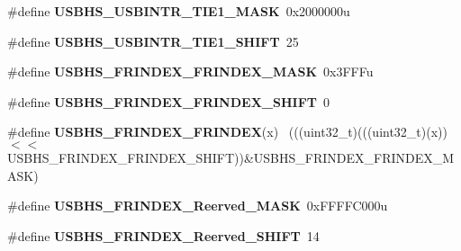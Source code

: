 \begin{DoxyCompactItemize}
\item 
\hypertarget{group___u_s_b_h_s___register___masks_ga32a97ffc6d76e4ed9b02bd67a669c4c1}{}\#define {\bfseries U\+S\+B\+H\+S\+\_\+\+U\+S\+B\+I\+N\+T\+R\+\_\+\+T\+I\+E1\+\_\+\+M\+A\+S\+K}~0x2000000u\label{group___u_s_b_h_s___register___masks_ga32a97ffc6d76e4ed9b02bd67a669c4c1}

\item 
\hypertarget{group___u_s_b_h_s___register___masks_ga2a588ff01b62819d758857915025a14b}{}\#define {\bfseries U\+S\+B\+H\+S\+\_\+\+U\+S\+B\+I\+N\+T\+R\+\_\+\+T\+I\+E1\+\_\+\+S\+H\+I\+F\+T}~25\label{group___u_s_b_h_s___register___masks_ga2a588ff01b62819d758857915025a14b}

\item 
\hypertarget{group___u_s_b_h_s___register___masks_gad957a9a1589065c9ad38f978e126cc67}{}\#define {\bfseries U\+S\+B\+H\+S\+\_\+\+F\+R\+I\+N\+D\+E\+X\+\_\+\+F\+R\+I\+N\+D\+E\+X\+\_\+\+M\+A\+S\+K}~0x3\+F\+F\+Fu\label{group___u_s_b_h_s___register___masks_gad957a9a1589065c9ad38f978e126cc67}

\item 
\hypertarget{group___u_s_b_h_s___register___masks_ga84437eba81c17d4e7a07f9b9d78ce454}{}\#define {\bfseries U\+S\+B\+H\+S\+\_\+\+F\+R\+I\+N\+D\+E\+X\+\_\+\+F\+R\+I\+N\+D\+E\+X\+\_\+\+S\+H\+I\+F\+T}~0\label{group___u_s_b_h_s___register___masks_ga84437eba81c17d4e7a07f9b9d78ce454}

\item 
\hypertarget{group___u_s_b_h_s___register___masks_ga258a2e1c3ad83e6673ed1d2a6fb060da}{}\#define {\bfseries U\+S\+B\+H\+S\+\_\+\+F\+R\+I\+N\+D\+E\+X\+\_\+\+F\+R\+I\+N\+D\+E\+X}(x)                              ~(((uint32\+\_\+t)(((uint32\+\_\+t)(x))$<$$<$U\+S\+B\+H\+S\+\_\+\+F\+R\+I\+N\+D\+E\+X\+\_\+\+F\+R\+I\+N\+D\+E\+X\+\_\+\+S\+H\+I\+F\+T))\&U\+S\+B\+H\+S\+\_\+\+F\+R\+I\+N\+D\+E\+X\+\_\+\+F\+R\+I\+N\+D\+E\+X\+\_\+\+M\+A\+S\+K)\label{group___u_s_b_h_s___register___masks_ga258a2e1c3ad83e6673ed1d2a6fb060da}

\item 
\hypertarget{group___u_s_b_h_s___register___masks_ga177c352e1d828864a1cf31a782b02fe6}{}\#define {\bfseries U\+S\+B\+H\+S\+\_\+\+F\+R\+I\+N\+D\+E\+X\+\_\+\+Reerved\+\_\+\+M\+A\+S\+K}~0x\+F\+F\+F\+F\+C000u\label{group___u_s_b_h_s___register___masks_ga177c352e1d828864a1cf31a782b02fe6}

\item 
\hypertarget{group___u_s_b_h_s___register___masks_ga1dbb70aeb26d4790adfb4eb418673385}{}\#define {\bfseries U\+S\+B\+H\+S\+\_\+\+F\+R\+I\+N\+D\+E\+X\+\_\+\+Reerved\+\_\+\+S\+H\+I\+F\+T}~14\label{group___u_s_b_h_s___register___masks_ga1dbb70aeb26d4790adfb4eb418673385}


\end{DoxyCompactItemize}
